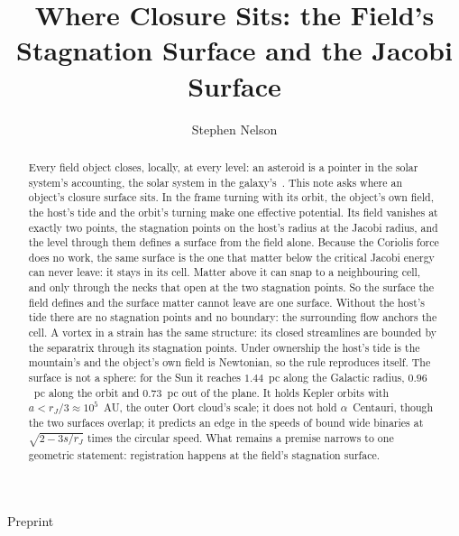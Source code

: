 \documentclass[twocolumn]{iopjournal}
\renewcommand{\articletype}[1]{%
  {\vspace*{-8mm}\noindent \Large \sf Preprint}\par
  \vspace*{6mm}\noindent{\scriptsize \sf{\bfseries \MakeUppercase{#1}}}}
\begin{document}
\articletype{Supplementary Material}

\title{Where Closure Sits: the Field's Stagnation Surface and the Jacobi Surface}

\author{Stephen Nelson}



\begin{abstract}
Every field object closes, locally, at every level: an asteroid is a
pointer in the solar system's accounting, the solar system in the
galaxy's~\cite{NelsonMS}. This note asks where an object's closure
surface sits. In the frame turning with its orbit, the object's own
field, the host's tide and the orbit's turning make one effective
potential. Its field vanishes at exactly two points, the stagnation
points on the host's radius at the Jacobi radius, and the level through
them defines a surface from the field alone. Because the Coriolis force
does no work, the same surface is the one that matter below the
critical Jacobi energy can never leave: it stays in its cell. Matter
above it can snap to a neighbouring cell, and only through the necks
that open at the two stagnation points. So the surface the field defines
and the surface matter cannot leave are one surface. Without the host's
tide there are no stagnation points and no boundary: the surrounding
flow anchors the cell. A vortex in a strain
has the same structure: its closed streamlines are bounded by the
separatrix through its stagnation points. Under ownership the host's
tide is the mountain's and the object's own field is Newtonian, so the
rule reproduces itself. The surface is not a sphere: for the Sun it
reaches $1.44$~pc along the Galactic radius, $0.96$~pc along the orbit
and $0.73$~pc out of the plane. It holds Kepler orbits with $a < r_J/3
\approx 10^5$~AU, the outer Oort cloud's scale; it does not hold
$\alpha$~Centauri, though the two surfaces overlap; it predicts an edge
in the speeds of bound wide binaries at $\sqrt{2 - 3s/r_J}$ times the
circular speed. What remains a premise narrows to one geometric
statement: registration happens at the field's stagnation surface.
\end{abstract}


\end{document}
